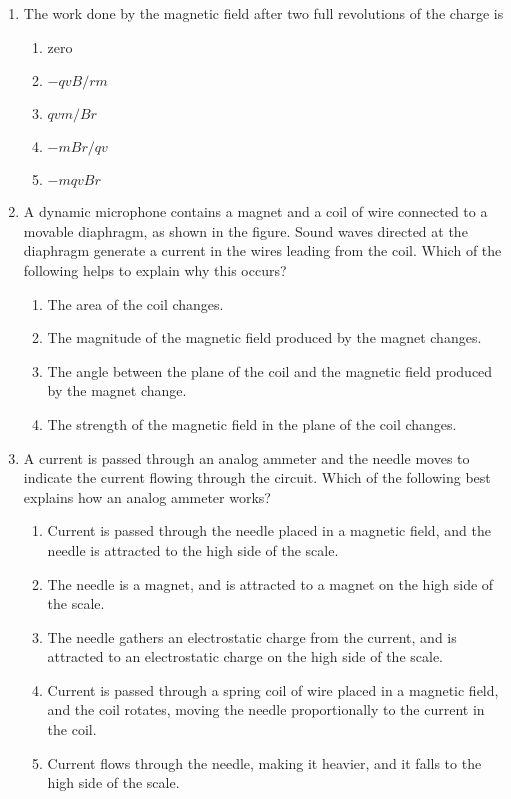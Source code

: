 \documentclass{../../../oss-classkick}
\begin{document}
\begin{multicols*}{2}
\begin{enumerate}[leftmargin=18pt,resume]
  \item The work done by the magnetic field after two full revolutions of the
    charge is
    \begin{enumerate}[nosep,leftmargin=18pt,label=(\Alph*)]
    \item zero
    \item $-qvB/rm$
    \item $qvm/Br$
    \item $-mBr/qv$
    \item $-mqvBr$
    \end{enumerate}
    \label{q:circ2}
    \columnbreak
    
  \item A dynamic microphone contains a magnet and a coil of wire connected to
    a movable diaphragm, as shown in the figure. Sound waves directed at the
    diaphragm generate a current in the wires leading from the coil. Which of
    the following helps to explain why this occurs?
    \begin{center}
    \end{center}
    \begin{enumerate}[nosep,leftmargin=18pt,label=(\Alph*)]
    \item The area of the coil changes.
    \item The magnitude of the magnetic field produced by the magnet changes.
    \item The angle between the plane of the coil and the magnetic field
      produced by the magnet change.
    \item The strength of the magnetic field in the plane of the coil changes.
    \end{enumerate}
    \vspace{.7in}
      \item A current is passed through an analog ammeter and the needle moves
    to indicate the current flowing through the circuit. Which of the
    following best explains how an analog ammeter works?
    \begin{enumerate}[nosep,leftmargin=18pt,label=(\Alph*)]
    \item Current is passed through the needle placed in a magnetic field,
      and the needle is attracted to the high side of the scale.
    \item The needle is a magnet, and is attracted to a magnet on the high
      side of the scale.
    \item The needle gathers an electrostatic charge from the current, and is
      attracted to an electrostatic charge on the high side of the scale.
    \item Current is passed through a spring coil of wire placed in a
      magnetic field, and the coil rotates, moving the needle
      proportionally to the current in the coil.
    \item Current flows through the needle, making it heavier, and it falls to
      the high side of the scale.
    \end{enumerate}
    \vspace{.7in}
    

\end{enumerate}
\end{multicols*}
\end{document}
